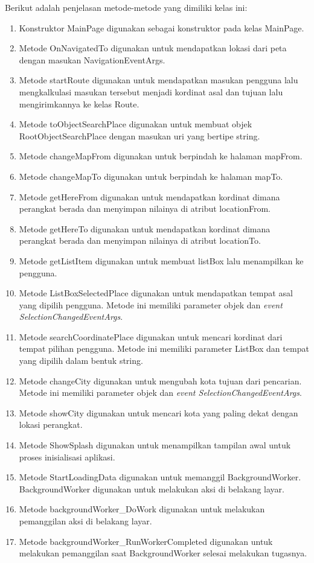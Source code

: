 Berikut adalah penjelasan metode-metode yang dimiliki kelas ini:
\begin{enumerate}
	\item Konstruktor MainPage digunakan sebagai konstruktor pada kelas MainPage.
	\item Metode OnNavigatedTo digunakan untuk mendapatkan lokasi dari peta dengan masukan NavigationEventArgs.
	\item Metode startRoute digunakan untuk mendapatkan masukan pengguna lalu mengkalkulasi masukan tersebut menjadi kordinat asal dan tujuan lalu mengirimkannya ke kelas Route.
	\item Metode toObjectSearchPlace digunakan untuk membuat objek RootObjectSearchPlace dengan masukan uri yang bertipe string.
	\item Metode changeMapFrom digunakan untuk berpindah ke halaman mapFrom.
	\item Metode changeMapTo digunakan untuk berpindah ke halaman mapTo.
	\item Metode getHereFrom digunakan untuk mendapatkan kordinat dimana perangkat berada dan menyimpan nilainya di atribut locationFrom.
	\item Metode getHereTo digunakan untuk mendapatkan kordinat dimana perangkat berada dan menyimpan nilainya di atribut locationTo.
	\item Metode getListItem digunakan untuk membuat listBox lalu menampilkan ke pengguna. 
	\item Metode ListBoxSelectedPlace digunakan untuk mendapatkan tempat asal yang dipilih pengguna. Metode ini memiliki parameter objek dan \textit{event SelectionChangedEventArgs}. 
	\item Metode searchCoordinatePlace digunakan untuk mencari kordinat dari tempat pilihan pengguna. Metode ini memiliki parameter ListBox dan tempat yang dipilih dalam bentuk string.
	\item Metode changeCity digunakan untuk mengubah kota tujuan dari pencarian. Metode ini memiliki parameter objek dan \textit{event SelectionChangedEventArgs}.
	\item Metode showCity digunakan untuk mencari kota yang paling dekat dengan lokasi perangkat.
	\item Metode ShowSplash digunakan untuk menampilkan tampilan awal untuk proses inisialisasi aplikasi.
	\item Metode StartLoadingData digunakan untuk memanggil BackgroundWorker. BackgroundWorker digunakan untuk melakukan aksi di belakang layar.
	\item Metode backgroundWorker\_DoWork digunakan untuk melakukan pemanggilan aksi di belakang layar.
	\item Metode backgroundWorker\_RunWorkerCompleted digunakan untuk melakukan pemanggilan saat BackgroundWorker selesai melakukan tugasnya.
\end{enumerate}

